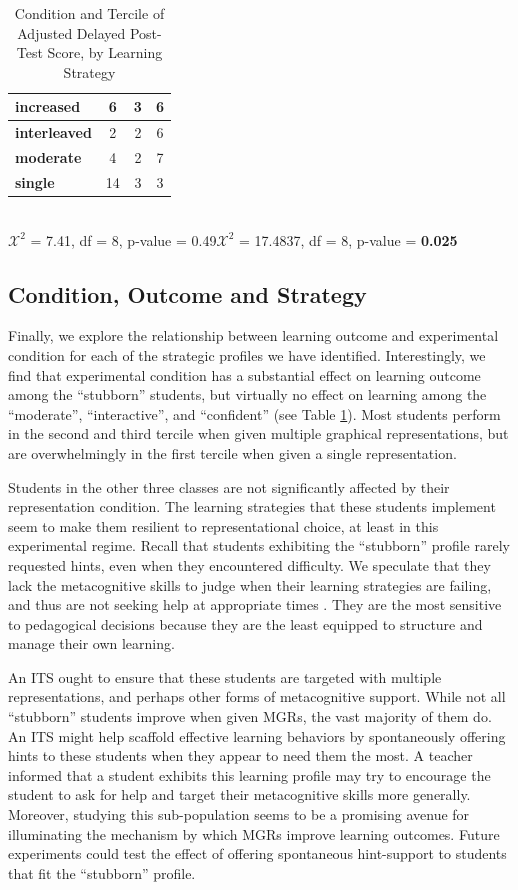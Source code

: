 \documentclass{edm_template}
\begin{document}
\begin{table}[htbp]
\begin{center}
\begin{tabular}{|l || c | c | c |}
  \textbf{increased}&    6&  3&  6 \\ \hline
  \textbf{interleaved}&  2&  2&  6 \\ \hline
  \textbf{moderate}&     4&  2& 7 \\ \hline
  \textbf{single}&       14&  3&  3 \\ \hline
 \end{tabular}
\\$\mathcal{X}^2$ = 7.41, df = 8, p-value = 0.49\hspace{15pt}$\mathcal{X}^2$ = 17.4837, df = 8, p-value = {\bf 0.025}
\end{center}
\caption{Condition and Tercile of Adjusted Delayed Post-Test Score, by Learning Strategy}
\label{tab:exp-and-score-by-LS}
\end{table}


\subsection{Condition, Outcome and Strategy}

Finally, we explore the relationship between learning outcome and experimental condition for each of the strategic profiles we have identified. Interestingly, we find that experimental condition has a substantial effect on learning outcome among the ``stubborn'' students, but virtually no effect on learning among the ``moderate'', ``interactive'', and ``confident''  (see Table \ref{tab:exp-and-score-by-LS}).  Most students perform in the second and third tercile when given multiple graphical representations, but are overwhelmingly in the first tercile when given a single representation. 

Students in the other three classes are not significantly affected by their representation condition. The learning strategies that these students implement seem to make them resilient to representational choice, at least in this experimental regime. Recall that students exhibiting the ``stubborn'' profile rarely requested hints, even when they encountered difficulty. We speculate that they lack the metacognitive skills to judge when their learning strategies are failing, and thus are not seeking help at appropriate times \cite{Aleven2006}. They are the most sensitive to pedagogical decisions because they are the least equipped to structure and manage their own learning. 

An ITS ought to ensure that these students are targeted with multiple representations, and perhaps other forms of metacognitive support. While not all ``stubborn'' students improve when given MGRs, the vast majority of them do. An ITS might help scaffold effective learning behaviors by spontaneously offering hints to these students when they appear to need them the most. A teacher informed that a student exhibits this learning profile may try to encourage the student to ask for help and target their metacognitive skills more generally. Moreover, studying this sub-population seems to be a promising avenue for illuminating the mechanism by which MGRs improve learning outcomes. Future experiments could test the effect of offering spontaneous hint-support to students that fit the ``stubborn'' profile.
\end{document}
